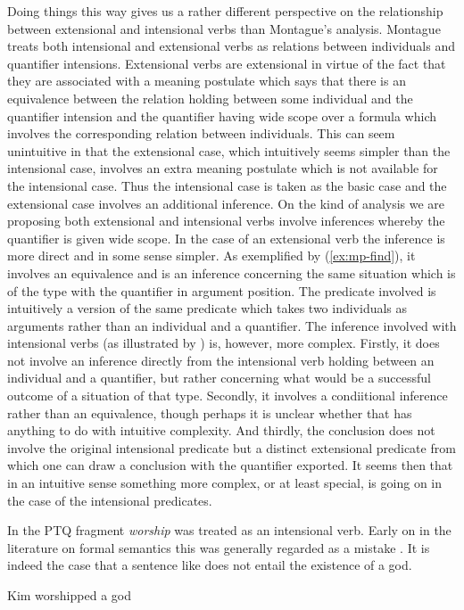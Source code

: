 Doing things this way gives us a rather different perspective on the
relationship between extensional and intensional verbs than Montague's
analysis.  Montague treats both intensional and extensional verbs as
relations between individuals and quantifier intensions.  Extensional
verbs are extensional in virtue of the fact that they are associated
with a meaning postulate which says that there is an equivalence
between the relation holding between some individual and the
quantifier intension and the quantifier having wide scope over
a formula which involves the corresponding relation between
individuals.  This can seem unintuitive in that the extensional case,
which intuitively seems simpler than the intensional case, involves an
extra meaning postulate which is not available for the intensional
case.  Thus the intensional case is taken as the basic case and the
extensional case involves an additional inference.  On the kind of
analysis we are proposing both extensional and intensional verbs
involve inferences whereby the quantifier is given wide scope.  In the
case of an extensional verb the inference is more direct and in some
sense simpler.  As exemplified by (\ref{ex:mp-find}), it involves an equivalence and is an inference
concerning the same situation which is of the type with the quantifier
in argument position.  The predicate involved is intuitively a version
of the same predicate which takes two individuals as arguments rather
than an individual and a quantifier.  The inference involved with
intensional verbs (as illustrated by \preveg{}) is, however, more
complex.  Firstly, it does not involve an inference directly from the
intensional verb holding between an individual and a quantifier, but
rather concerning what would be a successful outcome of a situation of
that type.  Secondly, it involves a condiitional inference rather than
an equivalence, though perhaps it is unclear whether that has anything
to do with intuitive complexity.  And thirdly, the conclusion does not
involve the original intensional predicate but a distinct extensional
predicate from which one can draw a conclusion with the quantifier
exported.  It seems then that in an intuitive sense something more
complex, or at least special, is going on in the case of the
intensional predicates.

In the PTQ fragment \citep{Montague1973} \textit{worship} was treated
as an intensional verb.  Early on in the literature on formal
semantics this was generally regarded as a mistake \citep{Bennett1974}.  It is indeed the case that a sentence like \nexteg{} does not
entail the existence of a god.
\begin{ex} 
Kim worshipped a god 
\end{ex}

